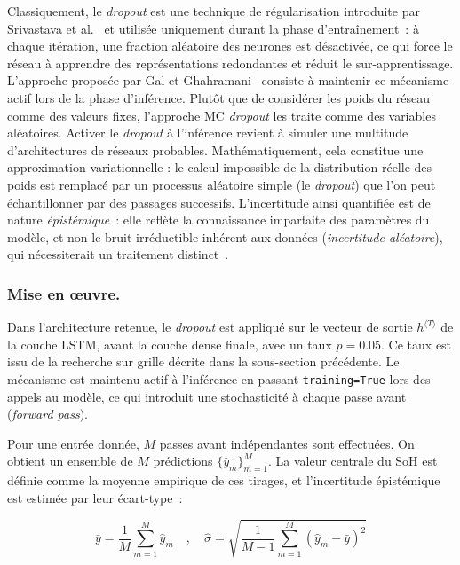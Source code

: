 Classiquement, le \textit{dropout} est une technique de régularisation
introduite par Srivastava et al.~\cite{srivastava_dropout_2014} et utilisée uniquement durant la phase d'entraînement~: à chaque itération, une fraction aléatoire des neurones est désactivée, ce qui force le réseau à apprendre des représentations redondantes et réduit le sur-apprentissage. L'approche proposée par Gal et Ghahramani~\cite{pmlr-v48-gal16} consiste à maintenir ce mécanisme actif lors de la phase d'inférence. Plutôt que de considérer les poids du réseau comme des valeurs fixes, l'approche MC \textit{dropout} les traite comme des variables aléatoires. Activer le \textit{dropout} à l'inférence revient à simuler une multitude d'architectures de réseaux probables. Mathématiquement, cela constitue une approximation variationnelle : le calcul impossible de la distribution réelle des poids est remplacé par un processus aléatoire simple (le \textit{dropout}) que l'on peut échantillonner par des passages successifs. L'incertitude ainsi quantifiée est de nature \textit{épistémique}~: elle reflète la connaissance imparfaite des paramètres du modèle, et non le bruit irréductible inhérent aux données (\textit{incertitude aléatoire}), qui nécessiterait un traitement distinct~\cite{kendall_what_2017}.

\subsubsection{Mise en \oe{}uvre.}
Dans l'architecture retenue, le \textit{dropout} est appliqué sur le vecteur de sortie $h^{\langle T \rangle}$ de la couche LSTM, avant la couche dense finale, avec un taux $p = 0.05$. Ce taux est issu de la recherche sur grille décrite dans la sous-section précédente. Le mécanisme est maintenu actif à l'inférence en passant \texttt{training=True} lors des appels au modèle, ce qui introduit une stochasticité à chaque passe avant (\textit{forward pass}).

Pour une entrée donnée, $M$ passes avant indépendantes sont effectuées. On obtient un ensemble de $M$ prédictions $\{\hat{y}_m\}_{m=1}^{M}$. La valeur centrale du SoH est définie comme la moyenne empirique de ces tirages, et l'incertitude épistémique est estimée par leur écart-type~:
 
\begin{equation}
    \bar{y} = \frac{1}{M} \sum_{m=1}^{M} \hat{y}_m
    \quad,\quad
    \hat{\sigma} = \sqrt{\frac{1}{M-1} \sum_{m=1}^{M} (\hat{y}_m - \bar{y})^2}
    \label{eq:mcd_stats}
\end{equation}
 
